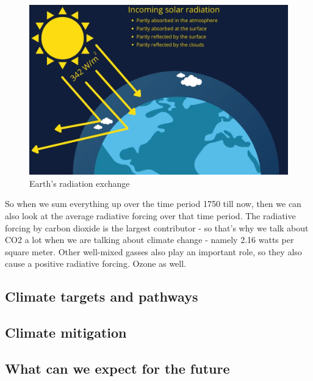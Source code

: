 \documentclass[../summary.tex]{subfiles}
\begin{document}
				\begin{figure}[h]
					\centering
					\includegraphics[width=0.7\linewidth]{../images/1-radiation-exchange.png}
					\caption{Earth's radiation exchange}
					\label{fig:1-radiation-exchange}
				\end{figure}
				\newpage
				So when we sum everything up over the time period 1750 till now, then we can also look at the average radiative forcing over that time period. The radiative forcing by carbon dioxide is the largest contributor - so that's why we talk about CO2 a lot when we are talking about climate change - namely 2.16 watts per square meter. Other well-mixed gasses also play an important role, so they also cause a positive radiative forcing. Ozone as well.
		\subsection{Climate targets and pathways}
		
		\subsection{Climate mitigation}
		
		\subsection{What can we expect for the future}
	
\end{document}
